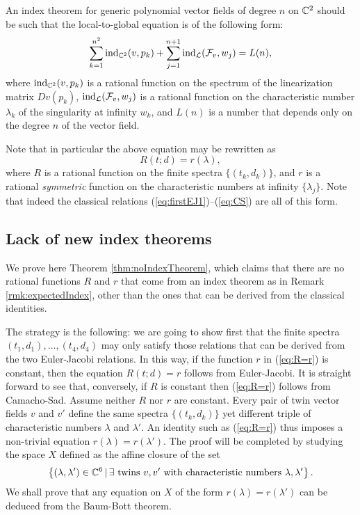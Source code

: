 \documentclass[phd,tocprelim]{cornell}
\begin{document}
\begin{remark} \label{rmk:expectedIndex}
 An index theorem for generic polynomial vector fields of degree $n$ on $\mathbb{C}^2$ should be such that the local-to-global equation is of the following form:
  \[ \sum_{k=1}^{n^2} \operatorname{ind}_{\mathbb{C}^2}(v,p_k) + \sum_{j=1}^{n+1} \operatorname{ind}_{\mathcal{L}}(\mathcal{F}_v,w_j) = L(n), \]
 where $\operatorname{ind}_{\mathbb{C}^2}(v,p_k) $ is a rational function on the spectrum of the linearization matrix $Dv(p_k)$, $\operatorname{ind}_{\mathcal{L}}(\mathcal{F}_v,w_j)$ is a rational function on the characteristic number $\lambda_k$ of the singularity at infinity $w_k$, and $L(n)$ is a number that depends only on the degree $n$ of the vector field.
\end{remark}

Note that in particular the above equation may be rewritten as 
 \begin{equation}\label{eq:R=r} 
  R(t;d) = r(\lambda), 
 \end{equation}
where $R$ is a rational function on the finite spectra $\{(t_k,d_k)\}$, and $r$ is a rational \textit{symmetric} function on the characteristic numbers at infinity $\{\lambda_j\}$. Note that indeed the classical relations (\ref{eq:firstEJ1})--(\ref{eq:CS}) are all of this form.


\subsection{Lack of new index theorems}

We prove here Theorem \ref{thm:noIndexTheorem}, which claims that there are no rational functions $R$ and $r$ that come from an index theorem as in Remark \ref{rmk:expectedIndex}, other than the ones that can be derived from the classical identities.

The strategy is the following: we are going to show first that the finite spectra $(t_1,d_1),\ldots,(t_4,d_4)$ may only satisfy those relations that can be derived from the two Euler-Jacobi relations. In this way, if the function $r$ in (\ref{eq:R=r}) is constant, then the equation $R(t;d)=r$ follows from Euler-Jacobi. It is straight forward to see that, conversely, if $R$ is constant then (\ref{eq:R=r}) follows from Camacho-Sad. Assume neither $R$ nor $r$ are constant. Every pair of twin vector fields $v$ and $v'$ define the same spectra $\{(t_k,d_k)\}$ yet different triple of characteristic numbers $\lambda$ and $\lambda'$. An identity such as (\ref{eq:R=r}) thus imposes a non-trivial equation $r(\lambda)=r(\lambda')$. The proof will be completed by studying the space $X$ defined as the affine closure of the set
 \[ \left\{{(\lambda,\lambda')\in\mathbb{C}^6}\,\vert\,{\exists\mbox{ twins }v,v'\mbox{ with characteristic numbers }\lambda,\lambda'}\right\}. \]
We shall prove that any equation on $X$ of the form $r(\lambda)=r(\lambda')$ can be deduced from the Baum-Bott theorem.
 
\end{document}
